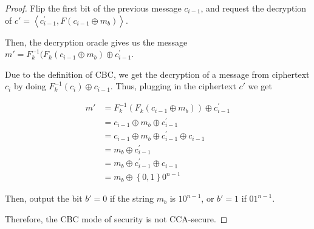 \documentclass{article}
\begin{document}
\begin{enumerate}
\begin{proof}
      Flip the first bit of the previous message $c_{i - 1}$, and request the decryption of
      $c' = \left\langle c^{'}_{i - 1}, F(c_{i - 1} \oplus m_b)\right\rangle$.

      Then, the decryption oracle gives us the message $m' = F_{k}^{-1}(F_k(c_{i
      - 1} \oplus m_b) \oplus c^{'}_{i - 1}$.

      Due to the definition of CBC, we get the decryption of a message from
      ciphertext $c_i$ by doing $F_{k}^{-1}(c_i) \oplus c_{i - 1}$. Thus,
      plugging in the ciphertext $c'$ we get

      \begin{align*}
        m' &= F_{k}^{-1}(F_k(c_{i - 1} \oplus m_b)) \oplus c^{'}_{i - 1}\\
           &= c_{i - 1} \oplus m_b \oplus c^{'}_{i - 1}\\
           &= c_{i - 1} \oplus m_b \oplus c^{'}_{i - 1} \oplus c_{i - 1}\\
           &= m_b \oplus c^{'}_{i - 1}\\
           &= m_b \oplus c^{'}_{i - 1} \oplus c_{i - 1}\\
           &= m_b \oplus \left\{0, 1\right\}0^{n - 1}
      \end{align*}

      Then, output the bit $b' = 0$ if the string $m_b$ is $10^{n - 1}$, or $b'
      = 1$ if $01^{n - 1}$.

      Therefore, the CBC mode of security is not CCA-secure.
    \end{proof}
\end{enumerate}
\end{document}
